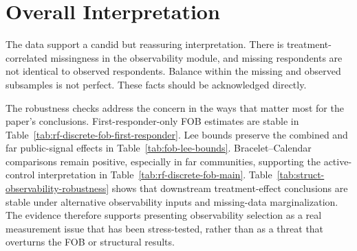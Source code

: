 \documentclass[11pt]{article}
\begin{document}
\section*{Overall Interpretation}

The data support a candid but reassuring interpretation. There is treatment-correlated missingness in the observability module, and missing respondents are not identical to observed respondents. Balance within the missing and observed subsamples is not perfect. These facts should be acknowledged directly.

The robustness checks address the concern in the ways that matter most for the paper's conclusions. First-responder-only FOB estimates are stable in Table~\ref{tab:rf-discrete-fob-first-responder}. Lee bounds preserve the combined and far public-signal effects in Table~\ref{tab:fob-lee-bounds}. Bracelet--Calendar comparisons remain positive, especially in far communities, supporting the active-control interpretation in Table~\ref{tab:rf-discrete-fob-main}. Table~\ref{tab:struct-observability-robustness} shows that downstream treatment-effect conclusions are stable under alternative observability inputs and missing-data marginalization. The evidence therefore supports presenting observability selection as a real measurement issue that has been stress-tested, rather than as a threat that overturns the FOB or structural results.
\end{document}
